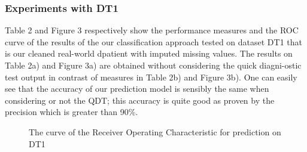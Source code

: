 \subsubsection{Experiments with DT1}
Table 2 and Figure 3 respectively show the performance measures and the ROC curve of the results of the our classification approach tested on dataset 
DT1 that is our cleaned real-world dpatient with imputed missing values. The results on Table 2a) and Figure 3a) are obtained without considering the 
quick diagni-ostic test output in contrast of measures in Table 2b) and Figure 3b). One can easily see that the accuracy of our prediction model is 
sensibly the same when considering or not the QDT; this accuracy is quite good as proven by the precision which is greater than 90\%.  

\begin{table}[!h]
\centering
{}%
\hspace*{0.5cm}
%
\label{perf-measure-dt1}\caption{Performance measures of the prediction on DT1}
\end{table}

\begin{figure}[!h]
\centering
{}%
\caption{The curve of the Receiver Operating Characteristic for prediction on DT1}\label{curve_roc_dt1}
\end{figure}



